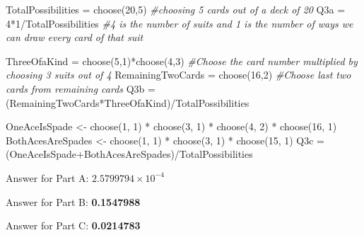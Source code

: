 \documentclass[
]{article}
\newenvironment{Shaded}{\begin{snugshade}}{\end{snugshade}}
\newcommand{\CommentTok}[1]{\textcolor[rgb]{0.56,0.35,0.01}{\textit{#1}}}
\newcommand{\DecValTok}[1]{\textcolor[rgb]{0.00,0.00,0.81}{#1}}
\newcommand{\FunctionTok}[1]{\textcolor[rgb]{0.00,0.00,0.00}{#1}}
\newcommand{\NormalTok}[1]{#1}
\newcommand{\OtherTok}[1]{\textcolor[rgb]{0.56,0.35,0.01}{#1}}
\newcommand{\SpecialCharTok}[1]{\textcolor[rgb]{0.00,0.00,0.00}{#1}}
\begin{document}
\begin{Shaded}
\begin{Highlighting}[]
\NormalTok{TotalPossibilities }\OtherTok{=} \FunctionTok{choose}\NormalTok{(}\DecValTok{20}\NormalTok{,}\DecValTok{5}\NormalTok{) }\CommentTok{\#choosing 5 cards out of a deck of 20}
\NormalTok{Q3a }\OtherTok{=} \DecValTok{4}\SpecialCharTok{*}\DecValTok{1}\SpecialCharTok{/}\NormalTok{TotalPossibilities }\CommentTok{\#4 is the number of suits and 1 is the number of ways we can draw every card of that suit}

\NormalTok{ThreeOfaKind }\OtherTok{=} \FunctionTok{choose}\NormalTok{(}\DecValTok{5}\NormalTok{,}\DecValTok{1}\NormalTok{)}\SpecialCharTok{*}\FunctionTok{choose}\NormalTok{(}\DecValTok{4}\NormalTok{,}\DecValTok{3}\NormalTok{) }\CommentTok{\#Choose the card number multiplied by choosing 3 suits out of 4}
\NormalTok{RemainingTwoCards }\OtherTok{=} \FunctionTok{choose}\NormalTok{(}\DecValTok{16}\NormalTok{,}\DecValTok{2}\NormalTok{) }\CommentTok{\#Choose last two cards from remaining cards}
\NormalTok{Q3b }\OtherTok{=}\NormalTok{ (RemainingTwoCards}\SpecialCharTok{*}\NormalTok{ThreeOfaKind)}\SpecialCharTok{/}\NormalTok{TotalPossibilities}

\NormalTok{OneAceIsSpade }\OtherTok{\textless{}{-}} \FunctionTok{choose}\NormalTok{(}\DecValTok{1}\NormalTok{, }\DecValTok{1}\NormalTok{) }\SpecialCharTok{*} \FunctionTok{choose}\NormalTok{(}\DecValTok{3}\NormalTok{, }\DecValTok{1}\NormalTok{) }\SpecialCharTok{*} \FunctionTok{choose}\NormalTok{(}\DecValTok{4}\NormalTok{, }\DecValTok{2}\NormalTok{) }\SpecialCharTok{*} \FunctionTok{choose}\NormalTok{(}\DecValTok{16}\NormalTok{, }\DecValTok{1}\NormalTok{)}
\NormalTok{BothAcesAreSpades }\OtherTok{\textless{}{-}} \FunctionTok{choose}\NormalTok{(}\DecValTok{1}\NormalTok{, }\DecValTok{1}\NormalTok{) }\SpecialCharTok{*} \FunctionTok{choose}\NormalTok{(}\DecValTok{3}\NormalTok{, }\DecValTok{1}\NormalTok{) }\SpecialCharTok{*} \FunctionTok{choose}\NormalTok{(}\DecValTok{15}\NormalTok{, }\DecValTok{1}\NormalTok{)}
\NormalTok{Q3c }\OtherTok{=}\NormalTok{ (OneAceIsSpade}\SpecialCharTok{+}\NormalTok{BothAcesAreSpades)}\SpecialCharTok{/}\NormalTok{TotalPossibilities}
\end{Highlighting}
\end{Shaded}

Answer for Part A: \textbf{\ensuremath{2.5799794\times 10^{-4}}}

Answer for Part B: \textbf{0.1547988}

Answer for Part C: \textbf{0.0214783}
\end{document}
